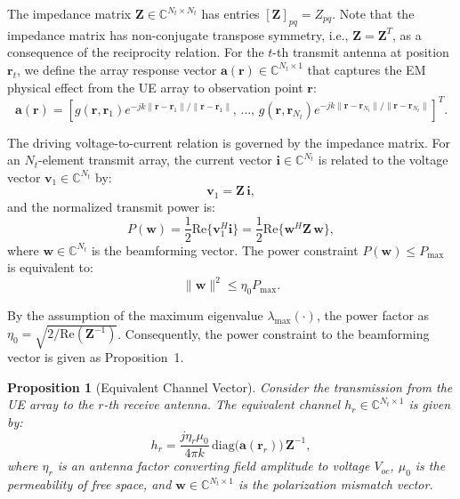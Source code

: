 \documentclass[journal]{IEEEtran}
\newtheorem{proposition}{Proposition}
\begin{document}
The impedance matrix $\mathbf{Z} \in \mathbb{C}^{N_t \times N_t}$ has entries $[\mathbf{Z}]_{pq} = Z_{pq}$. Note that the impedance matrix has non-conjugate transpose symmetry, i.e., $\mathbf{Z} = \mathbf{Z}^T$, as a consequence of the reciprocity relation. For the $t$-th transmit antenna at position $\mathbf{r}_t$, we define the array response vector $\mathbf{a}(\mathbf{r}) \in \mathbb{C}^{N_t \times 1}$ that captures the EM physical effect from the UE array to observation point $\mathbf{r}$:
\begin{equation}
    \mathbf{a}(\mathbf{r}) = \left[g(\mathbf{r}, \mathbf{r}_1)e^{-jk\|\mathbf{r} - \mathbf{r}_1\|/\|\mathbf{r} - \mathbf{r}_1\|},\,
    \ldots,\,
    g(\mathbf{r}, \mathbf{r}_{N_t})e^{-jk\|\mathbf{r} - \mathbf{r}_{N_t}\|/\|\mathbf{r} - \mathbf{r}_{N_t}\|}\right]^T.
\end{equation}

The driving voltage-to-current relation is governed by the impedance matrix. For an $N_t$-element transmit array, the current vector $\mathbf{i} \in \mathbb{C}^{N_t}$ is related to the voltage vector $\mathbf{v}_1 \in \mathbb{C}^{N_t}$ by:
\begin{equation}
    \mathbf{v}_1 = \mathbf{Z}\,\mathbf{i},
\end{equation}
and the normalized transmit power is:
\begin{equation}
    P(\mathbf{w}) = \frac{1}{2}\mathrm{Re}\{\mathbf{v}_1^H \mathbf{i}\} = \frac{1}{2}\mathrm{Re}\{\mathbf{w}^H \mathbf{Z}\,\mathbf{w}\},
\end{equation}
where $\mathbf{w} \in \mathbb{C}^{N_t}$ is the beamforming vector. The power constraint $P(\mathbf{w}) \leq P_{\max}$ is equivalent to:
\begin{equation}
    \|\mathbf{w}\|^2 \leq \eta_0 P_{\max}.
\end{equation}

By the assumption of the maximum eigenvalue $\lambda_{\max}(\cdot)$, the power factor as $\eta_0 = \sqrt{2/\mathrm{Re}(\mathbf{Z}^{-1})}$. Consequently, the power constraint to the beamforming vector is given as Proposition~1.

\begin{proposition}[Equivalent Channel Vector]
Consider the transmission from the UE array to the $r$-th receive antenna. The equivalent channel $h_r \in \mathbb{C}^{N_t \times 1}$ is given by:
\begin{equation}
    h_r = \frac{j\eta_r \mu_0}{4\pi k}\,\mathrm{diag}\!\bigl(\mathbf{a}(\mathbf{r}_r)\bigr)\,\mathbf{Z}^{-1},
    \label{eq:hr}
\end{equation}
where $\eta_r$ is an antenna factor converting field amplitude to voltage $V_{oc}$, $\mu_0$ is the permeability of free space, and $\mathbf{w} \in \mathbb{C}^{N_t \times 1}$ is the polarization mismatch vector.
\end{proposition}
\end{document}
